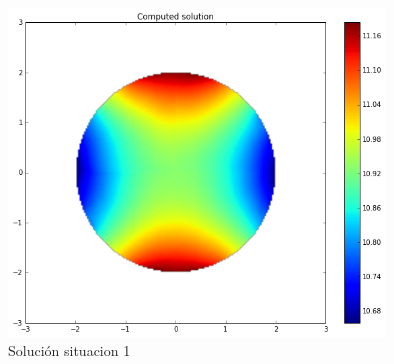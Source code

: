 \documentclass[11pt]{article}
\begin{document}
\begin{figure}[H]
\centering
\includegraphics[width=10cm]{Imagenes/graficas/Situacion 1/Solucion ecuacion 1/2d.png}
\caption{Solución situacion 1}
\end{figure}
\end{document}
